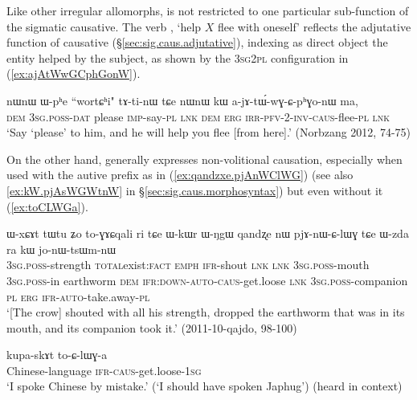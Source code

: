 Like other irregular allomorphs,  is not restricted to one particular sub-func\-tion of the sigmatic causative. The verb , `help $X$ flee with oneself' reflects the adjutative function of causative (§\ref{sec:sig.caus.adjutative}), indexing as direct object the entity helped by the subject, as shown by the \textsc{3sg}\fl{}\textsc{2pl} configuration in (\ref{ex:ajAtWwGCphGonW}).

\begin{exe}
\ex \label{ex:ajAtWwGCphGonW}
\gll nɯnɯ ɯ-pʰe ``wortɕʰi" tɤ-ti-nɯ tɕe nɯnɯ kɯ a-jɤ-tɯ́-wɣ-ɕ-pʰɣo-nɯ ma, \\
\textsc{dem} \textsc{3sg}.\textsc{poss}-\textsc{dat} please \textsc{imp}-say-\textsc{pl} \textsc{lnk} \textsc{dem} \textsc{erg} \textsc{irr}-\textsc{pfv}-2-\textsc{inv}-\textsc{caus}-flee-\textsc{pl} \textsc{lnk} \\
\glt `Say `please' to him, and he will help you flee [from here].' (Norbzang 2012, 74-75)
\end{exe}

On the other hand,  generally expresses non-volitional causation, especially when used with the autive prefix as in (\ref{ex:qandzxe.pjAnWClWG}) (see also \ref{ex:kW.pjAsWGWtnW} in §\ref{sec:sig.caus.morphosyntax}) but even without it (\ref{ex:toCLWGa}).

\begin{exe}
\ex \label{ex:qandzxe.pjAnWClWG}
\gll ɯ-xɕɤt tɯ\redp{}tu ʑo to-ɣɤɕqali ri tɕe ɯ-kɯr ɯ-ŋgɯ qandʐe nɯ pjɤ-nɯ-ɕ-lɯɣ tɕe ɯ-zda ra kɯ jo-nɯ-tsɯm-nɯ \\
\textsc{3sg}.\textsc{poss}-strength \textsc{total}\redp{}exist:\textsc{fact} \textsc{emph} \textsc{ifr}-shout \textsc{lnk} \textsc{lnk} \textsc{3sg}.\textsc{poss}-mouth \textsc{3sg}.\textsc{poss}-in earthworm \textsc{dem} \textsc{ifr}:\textsc{down}-\textsc{auto}-\textsc{caus}-get.loose \textsc{lnk} \textsc{3sg}.\textsc{poss}-companion \textsc{pl} \textsc{erg} \textsc{ifr}-\textsc{auto}-take.away-\textsc{pl} \\
\glt `[The crow] shouted with all his strength, dropped the earthworm that was in its mouth, and its companion took it.' (2011-10-qajdo, 98-100)
\end{exe}

\begin{exe}
\ex \label{ex:toCLWGa}
\gll kupa-skɤt to-ɕ-lɯɣ-a \\
Chinese-language \textsc{ifr}-\textsc{caus}-get.loose-\textsc{1sg} \\
\glt `I spoke Chinese by mistake.' (`I should have spoken Japhug') (heard in context)
\end{exe}

